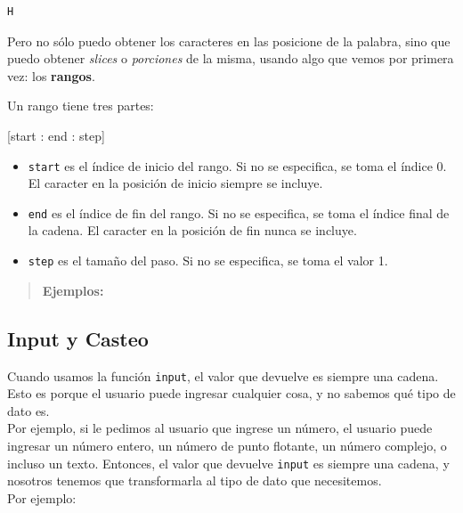 \documentclass[
  letterpaper,
  DIV=11,
  numbers=noendperiod]{scrreprt}
\newenvironment{Shaded}{\begin{snugshade}}{\end{snugshade}}
\newcommand{\NormalTok}[1]{\textcolor[rgb]{0.00,0.23,0.31}{#1}}
\providecommand{\tightlist}{%
  \setlength{\itemsep}{0pt}\setlength{\parskip}{0pt}}\usepackage{longtable,booktabs,array}
\begin{document}
\begin{verbatim}
H
\end{verbatim}

Pero no sólo puedo obtener los caracteres en las posicione de la
palabra, sino que puedo obtener \emph{slices} o \emph{porciones} de la
misma, usando algo que vemos por primera vez: los \textbf{rangos}.

Un rango tiene tres partes:

\begin{Shaded}
\begin{Highlighting}[]
\NormalTok{[start : end : step]}
\end{Highlighting}
\end{Shaded}

\begin{itemize}
\tightlist
\item
  \texttt{start} es el índice de inicio del rango. Si no se especifica,
  se toma el índice 0. El caracter en la posición de inicio siempre se
  incluye.
\item
  \texttt{end} es el índice de fin del rango. Si no se especifica, se
  toma el índice final de la cadena. El caracter en la posición de fin
  nunca se incluye.
\item
  \texttt{step} es el tamaño del paso. Si no se especifica, se toma el
  valor 1.
\end{itemize}

\begin{quote}
\textbf{Ejemplos:}
\end{quote}

\hypertarget{input-y-casteo}{%
\subsection{Input y Casteo}\label{input-y-casteo}}

Cuando usamos la función \texttt{input}, el valor que devuelve es
siempre una cadena. Esto es porque el usuario puede ingresar cualquier
cosa, y no sabemos qué tipo de dato es.\\

Por ejemplo, si le pedimos al usuario que ingrese un número, el usuario
puede ingresar un número entero, un número de punto flotante, un número
complejo, o incluso un texto. Entonces, el valor que devuelve
\texttt{input} es siempre una cadena, y nosotros tenemos que
transformarla al tipo de dato que necesitemos.\\

Por ejemplo:
\end{document}
